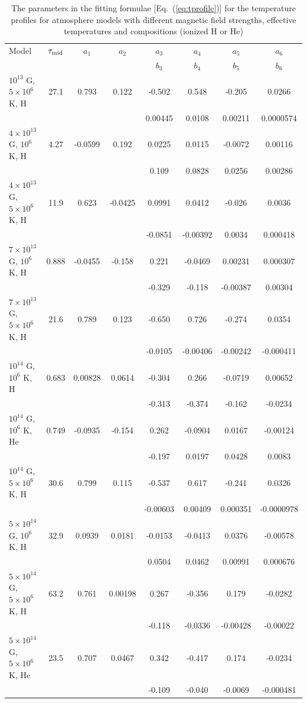 \documentclass[useAMS,onecolumn,usenatbib,usegraphicx]{mn2e}
\begin{document}
\begin{table}
\caption{The parameters in the fitting formulae [Eq.~(\ref{eq:tprofile})]
for the temperature profiles for atmosphere models
with different magnetic field strengths, effective temperatures and 
compositions (ionized H or He)}
\label{Table:Fitting}
\begin{tabular}{lccccccc}
\hline
Model & $\tau_{\rm mid}$ & $a_1$ & $a_2$ & $a_3$ & $a_4$ & $a_5$ & $a_6$ \\
&&&& $b_3$ & $b_4$ & $b_5$ & $b_6$ \\
\hline
$10^{13}$ G, $5\times 10^6$ K, H & 27.1 & 0.793 & 0.122 & -0.502 & 0.548 & -0.205 
	& 0.0266 \\
&&&& 0.00445 & 0.0108 & 0.00211 & 0.0000574 \\
$4\times 10^{13}$ G, $10^6$ K, H & 4.27 & -0.0599 & 0.192 & 0.0225 & 0.0115 & -0.0072 
	& 0.00116 \\ 
&&&& 0.109 & 0.0828 & 0.0256 & 0.00286 \\
$4\times 10^{13}$ G, $5\times 10^6$ K, H & 11.9 & 0.623 & -0.0425 & 0.0991 & 0.0412 & -0.026 
	& 0.0036 \\ 
&&&& -0.0851 & -0.00392 & 0.0034 & 0.000418 \\
$7\times 10^{13}$ G, $10^6$ K, H & 0.888 & -0.0455 & -0.158 & 0.221 & -0.0469 & 0.00231 
	& 0.000307 \\ 
&&&& -0.329 & -0.118 & -0.00387 & 0.00304 \\
$7\times 10^{13}$ G, $5\times 10^6$ K, H & 21.6 & 0.789 & 0.123 & -0.650 & 0.726 & -0.274 
	& 0.0354 \\
&&&& -0.0105 & -0.00406 & -0.00242 & -0.000411 \\
$10^{14}$ G, $10^6$ K, H & 0.683 & 0.00828 & 0.0614 & -0.304 & 0.266 & -0.0719 
	& 0.00652 \\
&&&& -0.313 & -0.374 & -0.162 & -0.0234 \\
$10^{14}$ G, $10^6$ K, He & 0.749 & -0.0935 & -0.154 & 0.262 & -0.0904 & 0.0167 
	& -0.00124 \\
&&&& -0.197 & 0.0197 & 0.0428 & 0.0083 \\
$10^{14}$ G, $5\times 10^6$ K, H & 30.6 & 0.799 & 0.115 & -0.537 & 0.617 & -0.241 
	& 0.0326 \\
&&&& -0.00603 & 0.00409 & 0.000351 & -0.0000978 \\
$5\times 10^{14}$ G, $10^6$ K, H & 32.9 & 0.0939 & 0.0181 & -0.0153 & -0.0413 & 0.0376 & -0.00578 
	\\
&&&& 0.0504 
& 0.0462 & 0.00991 & 0.000676 \\
$5\times 10^{14}$ G, $5\times 10^6$ K, H & 63.2 & 0.761 & 0.00198 & 0.267 & -0.356 & 0.179 
	& -0.0282 \\
&&&& -0.118 & -0.0336 & -0.00428 & -0.00022 \\
$5\times 10^{14}$ G, $5\times 10^6$ K, He & 23.5 & 0.707 & 0.0467 & 0.342 & -0.417 & 0.174 
	& -0.0234 \\
&&&& -0.109 & -0.040 & -0.0069 & -0.000481 \\
\hline
\end{tabular}

\end{table}
\end{document}
